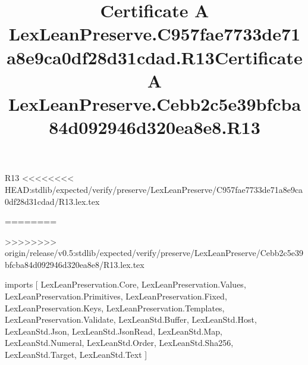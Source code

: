 \begin{lexlean}{R13}
<<<<<<<< HEAD:stdlib/expected/verify/preserve/LexLeanPreserve/C957fae7733de71a8e9ca0df28d31cdad/R13.lex.tex
\title{Certificate A LexLeanPreserve.C957fae7733de71a8e9ca0df28d31cdad.R13}
========
\title{Certificate A LexLeanPreserve.Cebb2c5e39bfcba84d092946d320ea8e8.R13}
>>>>>>>> origin/release/v0.5:stdlib/expected/verify/preserve/LexLeanPreserve/Cebb2c5e39bfcba84d092946d320ea8e8/R13.lex.tex
\begin{coremodule}
imports [
  LexLeanPreservation.Core,
  LexLeanPreservation.Values,
  LexLeanPreservation.Primitives,
  LexLeanPreservation.Fixed,
  LexLeanPreservation.Keys,
  LexLeanPreservation.Templates,
  LexLeanPreservation.Validate,
  LexLeanStd.Buffer,
  LexLeanStd.Host,
  LexLeanStd.Json,
  LexLeanStd.JsonRead,
  LexLeanStd.Map,
  LexLeanStd.Numeral,
  LexLeanStd.Order,
  LexLeanStd.Sha256,
  LexLeanStd.Target,
  LexLeanStd.Text
]


\end{coremodule}
\end{lexlean}

